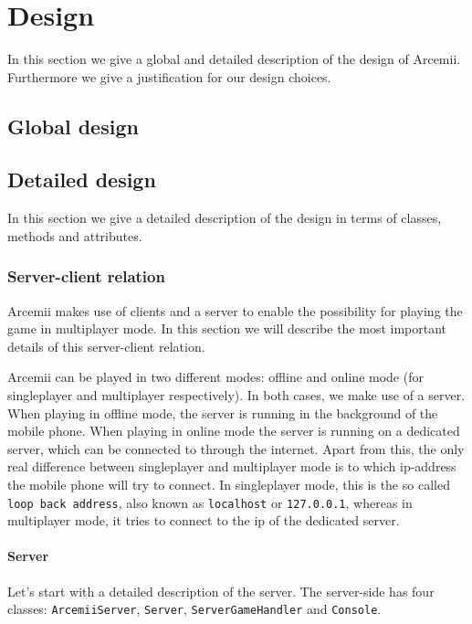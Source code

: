 \documentclass[../main.tex]{subfiles}
\begin{document}
\pagebreak

\section{Design}
In this section we give a global and detailed description of the design of Arcemii. Furthermore we give a justification for our design choices.

	\subsection{Global design}

    \pagebreak
    \subsection{Detailed design}
    In this section we give a detailed description of the design in terms of classes, methods and attributes.

        \subsubsection{Server-client relation}
        Arcemii makes use of clients and a server to enable the possibility for playing the game in multiplayer mode. In this section we will describe the most important details of this server-client relation.

        Arcemii can be played in two different modes: offline and online mode (for singleplayer and multiplayer respectively). In both cases, we make use of a server. When playing in offline mode, the server is running in the background of the mobile phone. When playing in online mode the server is running on a dedicated server, which can be connected to through the internet. Apart from this, the only real difference between singleplayer and multiplayer mode is to which ip-address the mobile phone will try to connect. In singleplayer mode, this is the so called \texttt{loop back address}, also known as \texttt{localhost} or \texttt{127.0.0.1}, whereas in multiplayer mode, it tries to connect to the ip of the dedicated server. 

        \paragraph{Server} 
        Let's start with a detailed description of the server. The server-side has four classes: \texttt{ArcemiiServer}, \texttt{Server}, \texttt{ServerGameHandler} and \texttt{Console}. 
        
\end{document}
